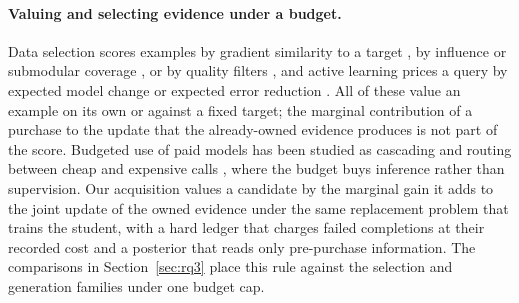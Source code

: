 \paragraph{Valuing and selecting evidence under a budget.}
Data selection scores examples by gradient similarity to a target
\citep{xia2024less}, by influence or submodular coverage
\citep{gist2026, trim2025, icons2025}, or by quality filters
\citep{chen2024alpagasus, liu2024deita}, and active learning prices a
query by expected model change or expected error reduction
\citep{settles2009active}. All of these value an example on its own or
against a fixed target; the marginal contribution of a purchase to the
update that the already-owned evidence produces is not part of the
score. Budgeted use of paid models has been studied as cascading and
routing between cheap and expensive calls \citep{chen2023frugalgpt},
where the budget buys inference rather than supervision. Our
acquisition values a candidate by the marginal gain it adds to the
joint update of the owned evidence under the same replacement problem
that trains the student, with a hard ledger that charges failed
completions at their recorded cost and a posterior that reads only
pre-purchase information. The comparisons in Section~\ref{sec:rq3}
place this rule against the selection and generation families under
one budget cap.
